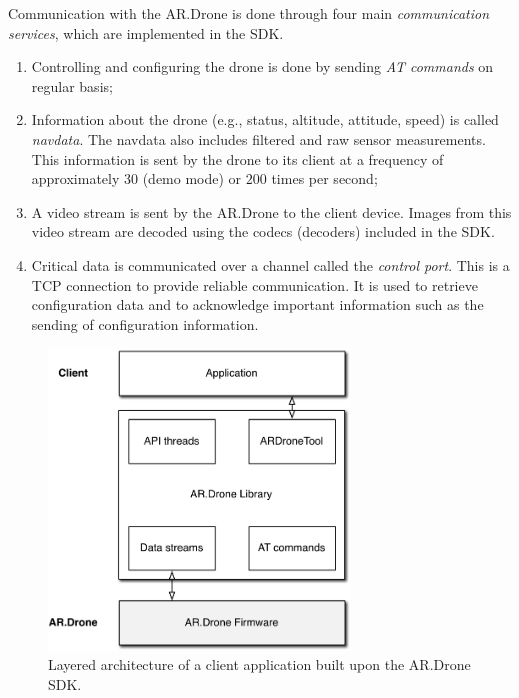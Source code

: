 Communication with the AR.Drone is done through four main \textit{communication services}, which are implemented in the SDK.
\begin{enumerate}
\item Controlling and configuring the drone is done by sending \textit{AT commands} on regular basis;
\item Information about the drone (e.g., status, altitude, attitude, speed) is called \textit{navdata}.
The navdata also includes filtered and raw sensor measurements.
This information is sent by the drone to its client at a frequency of approximately $30$ (demo mode) or $200$ times per second;
\item A video stream is sent by the AR.Drone to the client device.
Images from this video stream are decoded using the codecs (decoders) included in the SDK.
\item Critical data is communicated over a channel called the \textit{control port}.
This is a TCP connection to provide reliable communication.
It is used to retrieve configuration data and to acknowledge important information such as the sending of configuration information.
\end{enumerate}

\begin{figure}[htb]
\centering
\includegraphics[height=8cm]{images/platform_ardroneapi.pdf}
\caption{Layered architecture of a client application built upon the AR.Drone SDK.}
\label{fig:platform-ardroneapi}
\end{figure}


